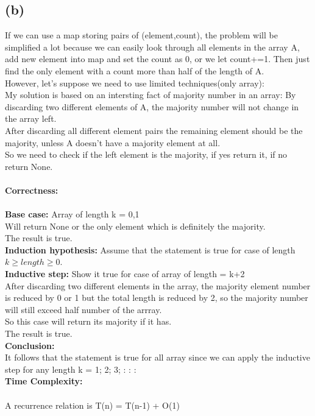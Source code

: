 \documentclass{article}
\begin{document}
\subsection{(b)}
If we can use a map storing pairs of (element,count), the problem will be simplified a lot because we can easily look through all elements in the array A, add new element into map and set the count as 0, or we let count+=1. Then just find the only element with a count more than half of the length of A.\\
However, let's suppose we need to use limited techniques(only array):\\
My solution is based on an intersting fact of majority number in an array: By discarding two different elements of A, the majority number will not change in the array left.\\
After discarding all different element pairs the remaining element should be the majority, unless A doesn't have a majority element at all.\\
So we need to check if the left element is the majority, if yes return it, if no return None.\\\\
\textbf{\large Correctness:}\\\\
\textbf{Base case:} Array of length k = 0,1\\
Will return None or the only element which is definitely the majority.\\
The result is true.\\
\textbf{Induction hypothesis:} Assume that the statement is true for case of length $k\ge length \ge 0$.\\
\textbf{Inductive step:} Show it true for case of array of length = k+2\\
After discarding two different elements in the array, the majority element number is reduced by 0 or 1 but the total length is reduced by 2, so the majority number will still exceed half number of the arrray.\\
So this case will return its majority if it has.\\
The result is true.\\
\textbf{Conclusion:}\\
It follows that the statement is true for all array since we can apply the inductive step for any length k = 1; 2; 3; : : :\\
\textbf{\large Time Complexity:}\\\\
A recurrence relation is T(n) = T(n-1) + O(1)\\
\end{document}
